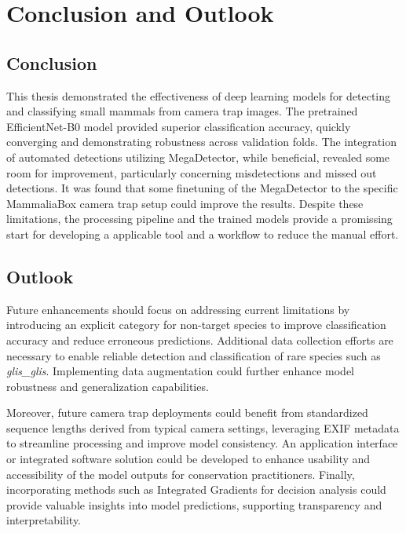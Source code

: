 


\section{Conclusion and Outlook}
\label{conclusion_outlook}

\subsection{Conclusion}

This thesis demonstrated the effectiveness of deep learning models for detecting and classifying small mammals from camera trap images.
The pretrained EfficientNet-B0 model provided superior classification accuracy, quickly converging and demonstrating robustness across validation folds.
The integration of automated detections utilizing MegaDetector, while beneficial, revealed some room for improvement, particularly concerning misdetections and missed out detections.
It was found that some finetuning of the MegaDetector to the specific MammaliaBox camera trap setup could improve the results.
Despite these limitations, the processing pipeline and the trained models provide a promissing start for developing a applicable tool and a workflow to reduce the manual effort.


\subsection{Outlook}

Future enhancements should focus on addressing current limitations by introducing an explicit category for non-target species to improve classification accuracy and reduce erroneous predictions.
Additional data collection efforts are necessary to enable reliable detection and classification of rare species such as \textit{glis\_glis}.
Implementing data augmentation could further enhance model robustness and generalization capabilities.

Moreover, future camera trap deployments could benefit from standardized sequence lengths derived from typical camera settings, leveraging EXIF metadata to streamline processing and improve model consistency.
An application interface or integrated software solution could be developed to enhance usability and accessibility of the model outputs for conservation practitioners.
Finally, incorporating methods such as Integrated Gradients for decision analysis could provide valuable insights into model predictions, supporting transparency and interpretability.

